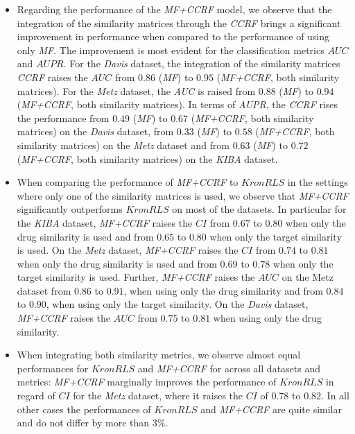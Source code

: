 \begin{itemize}
\item Regarding the performance of the \textit{MF+CCRF} model, we observe that the integration of the similarity matrices through the \textit{CCRF} brings a significant improvement in performance when compared to the performance of using only \textit{MF}. The improvement is most evident for the classification metrics $AUC$ and $AUPR$. For the \textit{Davis} dataset, the integration of the similarity matrices \textit{CCRF} raises the $AUC$ from $0.86$ (\textit{MF}) to $0.95$ (\textit{MF+CCRF}, both similarity matrices). For the \textit{Metz} dataset, the \textit{AUC} is raised from $0.88$ (\textit{MF}) to $0.94$ (\textit{MF+CCRF}, both similarity matrices). In terms of \textit{AUPR}, the \textit{CCRF} rises the performance from $0.49$ (\textit{MF}) to $0.67$ (\textit{MF+CCRF}, both similarity matrices) on the \textit{Davis} dataset, from $0.33$ (\textit{MF}) to $0.58$ (\textit{MF+CCRF}, both similarity matrices) on the \textit{Metz} dataset and from $0.63$ (\textit{MF}) to $0.72$ (\textit{MF+CCRF}, both similarity matrices) on the \textit{KIBA} dataset.
\item When comparing the performance of \textit{MF+CCRF} to $KronRLS$ in the settings where only one of the similarity matrices is used, we observe that \textit{MF+CCRF} significantly outperforms $KronRLS$ on most of the datasets. In particular for the \textit{KIBA} dataset, \textit{MF+CCRF} raises the $CI$ from $0.67$ to $0.80$ when only the drug similarity is used and from $0.65$ to $0.80$ when only the target similarity is used. On the \textit{Metz} dataset, \textit{MF+CCRF} raises the $CI$ from $0.74$ to $0.81$ when only the drug similarity is used and from $0.69$ to $0.78$ when only the target similarity is used. Further, \textit{MF+CCRF} raises the $AUC$ on the Metz dataset from $0.86$ to $0.91$, when using only the drug similarity and from $0.84$ to $0.90$, when using only the target similarity. On the \textit{Davis} dataset, \textit{MF+CCRF} raises the $AUC$ from $0.75$ to $0.81$ when using only the drug similarity.
\item When integrating both similarity metrics, we observe almost equal performances for $KronRLS$ and \textit{MF+CCRF} for across all datasets and metrics: \textit{MF+CCRF} marginally improves the performance of $KronRLS$ in regard of $CI$ for the \textit{Metz} dataset, where it raises the $CI$ of $0.78$ to $0.82$. In all other cases the performances of $KronRLS$ and \textit{MF+CCRF} are quite similar and do not differ by more than 3$\%$.
\end{itemize}



